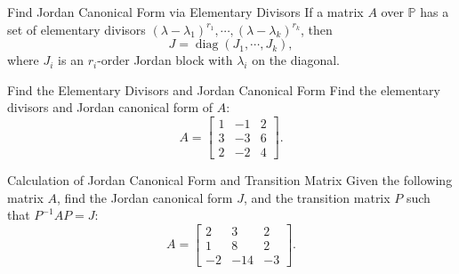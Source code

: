 \begin{proposition}{Find Jordan Canonical Form via Elementary Divisors}{}
  If a matrix $A$ over $\mathbb{P}$ has a set of elementary divisors
  $(\lambda - \lambda_1)^{r_1},\cdots,(\lambda - \lambda_k)^{r_k}$, then
  \begin{equation}
    J = \operatorname{diag}(J_1, \cdots, J_k),
  \end{equation}
  where $J_i$ is an $r_i$-order Jordan block with $\lambda_i$ on the diagonal.
\end{proposition}

\begin{example}{Find the Elementary Divisors and Jordan Canonical Form}{}
  Find the elementary divisors and Jordan canonical form of $A$:
  \begin{equation}
    A =
    \begin{bmatrix}
      1 & -1 & 2\\
      3 & -3 & 6\\
      2 & -2 & 4
    \end{bmatrix}.
  \end{equation}
\end{example}

\begin{example}{Calculation of Jordan Canonical Form and Transition Matrix}{}
  Given the following matrix $A$, find the Jordan canonical form $J$,
  and the transition matrix $P$ such that $P^{-1}AP = J$:
  \begin{equation}
    A =
    \begin{bmatrix}
      2 & 3 & 2\\
      1 & 8 & 2\\
      -2 & -14 & -3
    \end{bmatrix}.
  \end{equation}
\end{example}


